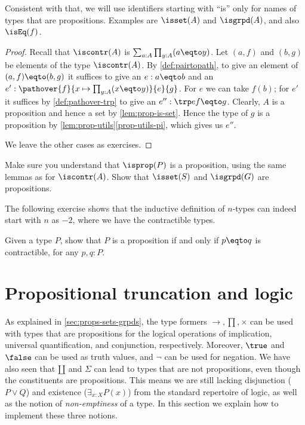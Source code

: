 Consistent with that, we will use identifiers starting with ``is'' only for names of types
that are propositions. Examples are $\isset(A)$ and $\isgrpd(A)$,
and also $\isEq(f)$.

\begin{proof}
Recall that $\iscontr(A)$ is $\sum_{a:A} \prod_{y:A} (a \eqto y)$.
Let $(a,f)$ and $(b,g)$ be elements of the type $\iscontr(A)$.
By \cref{def:pairtopath}, to give an element of $(a,f) \eqto (b,g)$ it suffices
to give an $e : a \eqto b$ and an $e' : \pathover{f}{x\mapsto\prod_{y:A} (x \eqto y)}{e}{g}$.
For $e$ we can take $f(b)$; for $e'$ it suffices by \cref{def:pathover-trp}
to give an $e'' : \trp e f \eqto g$. Clearly, $A$ is a proposition and hence
a set by \cref{lem:prop-is-set}. Hence the type of $g$ is a proposition
by \cref{lem:prop-utils}\ref{prop-utils-pi}, which gives us $e''$.

We leave the other cases as exercises.
\end{proof}

\begin{xca}\label{xca:isX-is-prop}
Make sure you understand that $\isprop(P)$ is a proposition,
using the same lemmas as for $\iscontr(A)$.
Show that $\isset(S)$ and $\isgrpd(G)$ are propositions.
\end{xca}

The following exercise shows that the inductive definition of $n$-types can
indeed start with $n$ as $-2$, where we have the contractible types.

\begin{xca}\label{xca:prop-contractible=}
Given a type $P$, show that $P$ is a proposition if and only if $p \eqto q$ is contractible,
for any $p, q: P$.
\end{xca}


\section{Propositional truncation and logic}
\label{sec:prop-trunc}

As explained in \cref{sec:props-sets-grpds},
the type formers $\to,\prod,\times$
can be used with types that are propositions for the logical operations of implication,
universal quantification, and conjunction, respectively.
Moreover, $\true$ and $\false$ can be used as truth values,
and $\neg$ can be used for negation.
We have also seen that ${\amalg}$ and $\Sigma$ can lead to types
that are not propositions, even though the constituents are
propositions. This means we are still lacking disjunction ($P \vee Q$) and existence ($\exists_{x:X} P(x)$)
from the standard repertoire of logic, as well as the notion of \emph{non-emptiness} of a type.
In this section we explain how to implement these three notions.

